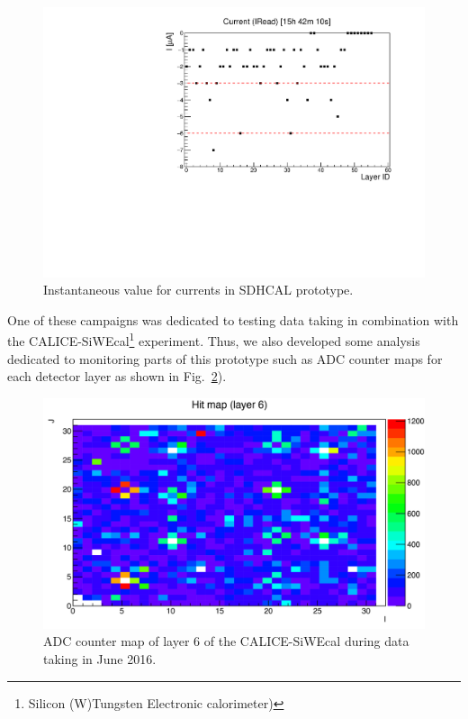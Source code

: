 \documentclass[conference]{IEEEtran}
\begin{document}
\begin{figure}[htbp]
  \begin{center}
    \includegraphics[width=0.95\linewidth]{figs/DQM_SDHCAL_Current_SC13.pdf}
    \caption{\label{fig:DQMCurrents} Instantaneous value for currents in SDHCAL prototype.}
  \end{center}
\end{figure}

One of these campaigns was dedicated to testing data taking in combination with the CALICE-SiWEcal\footnote{Silicon (W)Tungsten Electronic calorimeter)} experiment. Thus, we also developed some analysis dedicated to monitoring parts of this prototype such as ADC counter maps for each detector layer as shown in  Fig.~\ref{fig:DQMEcalDisplay}).

\begin{figure}[htbp]
  \begin{center}
    \includegraphics[width=\linewidth]{figs/DQM_SDHCAL_ECAL_HitMap6_I732891.pdf}
    \caption{\label{fig:DQMEcalDisplay} ADC counter map of layer 6 of the CALICE-SiWEcal during data taking in June 2016.}
  \end{center}
\end{figure}
\end{document}
